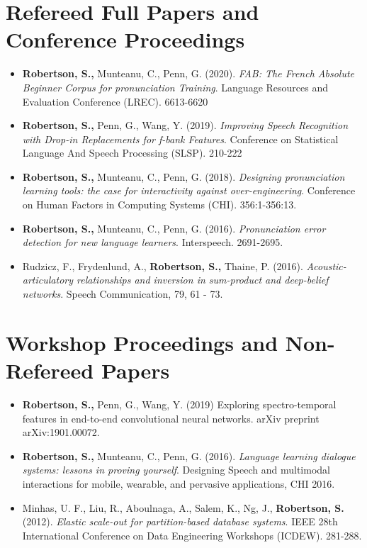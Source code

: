 \documentclass{article}
\begin{document}
\section{Refereed Full Papers and Conference Proceedings}
\begin{itemize}
  \item \textbf{Robertson, S.,} Munteanu, C., Penn, G. (2020).
    \textit{FAB: The French Absolute Beginner Corpus for pronunciation
    Training}. Language Resources and Evaluation Conference (LREC). 6613-6620

  \item \textbf{Robertson, S.,} Penn, G., Wang, Y. (2019).
    \textit{Improving Speech Recognition with Drop-in Replacements for f-bank
    Features}. Conference on Statistical Language And Speech Processing
    (SLSP). 210-222

  \item \textbf{Robertson, S.,} Munteanu, C., Penn, G. (2018).
    \textit{Designing pronunciation learning tools: the case for interactivity
    against over-engineering}. Conference on Human Factors in Computing Systems
    (CHI). 356:1-356:13.

  \item \textbf{Robertson, S.,} Munteanu, C., Penn, G. (2016).
    \textit{Pronunciation error detection for new language learners}.
    Interspeech. 2691-2695.

  \item Rudzicz, F., Frydenlund, A., \textbf{Robertson, S.,} Thaine, P. (2016).
    \textit{Acoustic-articulatory relationships and inversion in sum-product
    and deep-belief networks}. Speech Communication, 79, 61 - 73.
\end{itemize}

\section{Workshop Proceedings and Non-Refereed Papers}
\begin{itemize}
  \item \textbf{Robertson, S.,} Penn, G., Wang, Y. (2019) Exploring
    spectro-temporal features in end-to-end convolutional neural networks.
    arXiv preprint arXiv:1901.00072.

  \item \textbf{Robertson, S.,} Munteanu, C., Penn, G. (2016).
    \textit{Language learning dialogue systems: lessons in proving yourself}.
    Designing Speech and multimodal interactions for mobile, wearable, and
    pervasive applications, CHI 2016.

  \item Minhas, U. F., Liu, R., Aboulnaga, A., Salem, K., Ng, J.,
    \textbf{Robertson, S.} (2012). \textit{Elastic scale-out for
    partition-based database systems}. IEEE 28th International Conference on
    Data Engineering Workshops (ICDEW). 281-288.

\end{itemize}
\end{document}
